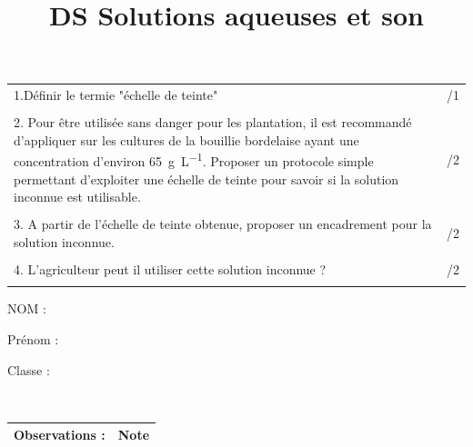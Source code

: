 \documentclass[a4paper,12pt]{article}
\begin{document}
\begin{tabular}{m{.9\linewidth}|m{.1\linewidth}}
    1.Définir le termie "échelle de teinte" & /1\\
     \rule{0pt}{2cm} & \\
    2. Pour être utilisée sans danger pour les plantation, il est recommandé d'appliquer sur les cultures de la bouillie bordelaise ayant une concentration d'environ \SI{65}{\gram\per\liter}. Proposer un protocole simple permettant d'exploiter une échelle de teinte pour savoir si la solution inconnue est utilisable. & /2 \\
     \rule{0pt}{2cm} & \\
    3. A partir de l'échelle de teinte obtenue, proposer un encadrement pour la solution inconnue. & /2\\
     \rule{0pt}{2cm} & \\
    4. L'agriculteur peut il utiliser cette solution inconnue ? & /2\\
     \rule{0pt}{2cm} & \\
\end{tabular}

\newpage
\title{DS Solutions aqueuses et son}
\begin{minipage}{.4\linewidth}
    NOM :
\end{minipage}
\begin{minipage}{.4\linewidth}
    Prénom :
\end{minipage}
\begin{minipage}{.2\linewidth}
    Classe :
\end{minipage}\\

\begin{tabular}{p{.7\linewidth}|p{.22\linewidth}}
    \hline
    Observations : \vspace{3em}& Note \\
    \hline
\end{tabular}\\
\vspace{-2em}
\end{document}
